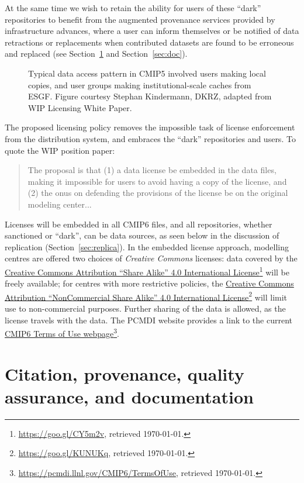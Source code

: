 \documentclass[gmd,manuscript]{copernicus}
\newcommand{\urlref}[2] {\href{#1}{#2}\footnote{\url{#1}, retrieved \today.}}
\begin{document}
At the same time we wish to retain the ability for users of these ``dark''
repositories to benefit from the augmented provenance services provided by
infrastructure advances, where a user can inform themselves or be notified
of data retractions or replacements when contributed datasets are found to be
erroneous and replaced (see Section~\ref{sec:cite} and Section~\ref{sec:doc}).

\begin{figure*}
  \begin{center}
  \end{center}
  \caption{Typical data access pattern in CMIP5 involved users making
    local copies, and user groups making institutional-scale caches
    from ESGF. Figure courtesy Stephan Kindermann, DKRZ, adapted from
    WIP Licensing White Paper.}
  \label{fig:dark}
\end{figure*}

The proposed licensing policy removes the impossible
task of license enforcement from the distribution system, and embraces
the ``dark'' repositories and users. To quote the WIP position paper:

\begin{quote}
  The proposal is that (1) a data license be embedded in the data
  files, making it impossible for users to avoid having a copy of the
  license, and (2) the onus on defending the provisions of the license
  be on the original modeling center...
\end{quote}

Licenses will be embedded in all CMIP6 files, and all repositories, whether
sanctioned or ``dark'', can be data sources, as seen below in the
discussion of replication (Section~\ref{sec:replica}).
In the embedded license approach, modelling centres are offered two
choices of \emph{Creative Commons} licenses: data covered by the
\urlref{https://goo.gl/CY5m2v}{Creative Commons Attribution ``Share
  Alike'' 4.0 International License} will be freely available; for
centres with more restrictive policies, the
\urlref{https://goo.gl/KUNUKq}{Creative Commons Attribution
  ``NonCommercial Share Alike'' 4.0 International License} will limit use 
to non-commercial purposes. Further sharing of the data
is allowed, as the license travels with the data. The PCMDI website
provides a link to the current
\urlref{https://pcmdi.llnl.gov/CMIP6/TermsOfUse}{CMIP6 Terms of Use
  webpage}.

\section{Citation, provenance, quality assurance, and documentation}
\label{sec:cite}
\end{document}
